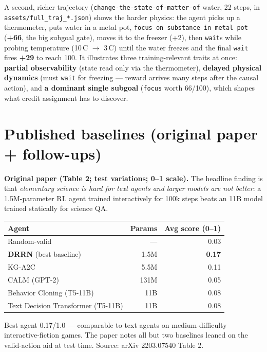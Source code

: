 \documentclass[10pt]{article}
\newcommand{\cmd}[1]{\texttt{\small #1}}
\begin{document}
\noindent A second, richer trajectory (\cmd{change-the-state-of-matter-of} water, 22 steps, in
\cmd{assets/full\_traj\_*.json}) shows the harder physics: the agent picks up a thermometer, puts water in
a metal pot, \cmd{focus on substance in metal pot} (\textbf{+66}, the big subgoal gate), moves it to the
freezer (+2), then \cmd{wait}s while probing temperature (10\,\textdegree C $\rightarrow$ 3\,\textdegree C)
until the water freezes and the final \cmd{wait} fires \textbf{+29} to reach 100. It illustrates three
training-relevant traits at once: \textbf{partial observability} (state read only via the thermometer),
\textbf{delayed physical dynamics} (must \cmd{wait} for freezing --- reward arrives many steps after the
causal action), and \textbf{a dominant single subgoal} (\cmd{focus} worth 66/100), which shapes what credit
assignment has to discover.

\section{Published baselines (original paper + follow-ups)}
\textbf{Original paper (Table 2; test variations; 0--1 scale).} The headline finding is that
\emph{elementary science is hard for text agents and larger models are not better}: a 1.5M-parameter RL
agent trained interactively for 100k steps beats an 11B model trained statically for science QA.

\begin{center}\small
\begin{tabular}{lrr}
\toprule
Agent & Params & Avg score (0--1) \\
\midrule
Random-valid & --- & 0.03 \\
\textbf{DRRN} (best baseline) & 1.5M & \textbf{0.17} \\
KG-A2C & 5.5M & 0.11 \\
CALM (GPT-2) & 131M & 0.05 \\
Behavior Cloning (T5-11B) & 11B & 0.08 \\
Text Decision Transformer (T5-11B) & 11B & 0.08 \\
\bottomrule
\end{tabular}
\end{center}
\noindent\footnotesize Best agent 0.17/1.0 --- comparable to text agents on medium-difficulty
interactive-fiction games. The paper notes all but two baselines leaned on the valid-action aid at test
time. Source: arXiv 2203.07540 Table 2.\normalsize
\end{document}
